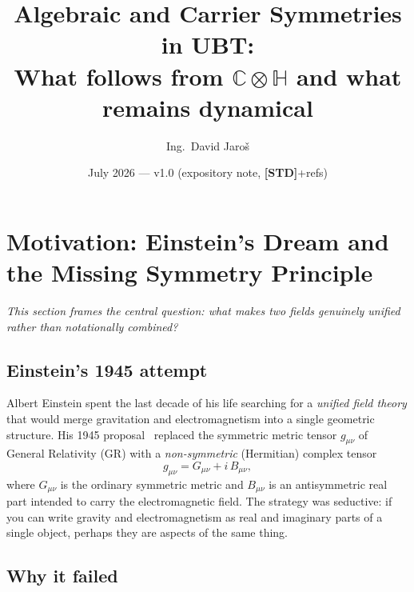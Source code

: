 \documentclass[12pt,a4paper]{article}
\title{%
  Algebraic and Carrier Symmetries in UBT:\\[4pt]
  \large What follows from $\mathbb{C}\otimes\mathbb{H}$ and what remains dynamical}
\author{Ing.\ David Jaro\v{s}}
\date{July 2026 — v1.0 (expository note, \textbf{[STD]}+refs)}
\theoremstyle{definition}
\theoremstyle{remark}
\begin{document}
\maketitle
\tableofcontents
\bigskip

\fi %

\section{Motivation: Einstein's Dream and the Missing Symmetry Principle}
\label{sec:motivation}

\textit{This section frames the central question: what makes two fields
genuinely unified rather than notationally combined?}

\subsection{Einstein's 1945 attempt}

Albert Einstein spent the last decade of his life searching for a
\emph{unified field theory} that would merge gravitation and electromagnetism
into a single geometric structure.  His 1945 proposal~\cite{einstein1945}
replaced the symmetric metric tensor $g_{\mu\nu}$ of General Relativity (GR)
with a \emph{non-symmetric} (Hermitian) complex tensor
\begin{equation}
  \label{eq:einstein_g}
  g_{\mu\nu} = G_{\mu\nu} + i\,B_{\mu\nu},
\end{equation}
where $G_{\mu\nu}$ is the ordinary symmetric metric and $B_{\mu\nu}$ is an
antisymmetric real part intended to carry the electromagnetic field.
The strategy was seductive: if you can write gravity and electromagnetism as
real and imaginary parts of a single object, perhaps they are aspects of the
same thing.

\subsection{Why it failed}
\end{document}
